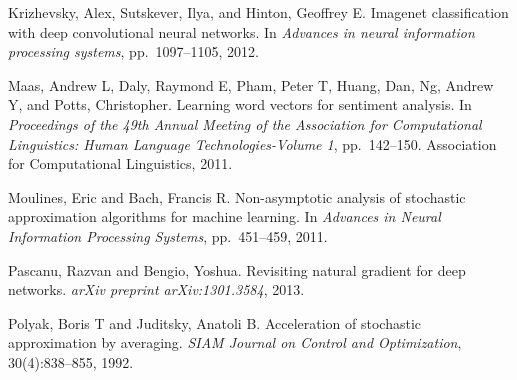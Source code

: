\documentclass[11pt]{article}
\begin{document}
\begin{list}{}{%
  \setlength{\leftmargin}{1.5em}%
  \setlength{\itemindent}{-1.5em}%
  \setlength{\itemsep}{0.5em}%
  \setlength{\parsep}{0pt}%
}
\item Krizhevsky, Alex, Sutskever, Ilya, and Hinton, Geoffrey E.
Imagenet classification with deep convolutional neural networks.
In \emph{Advances in neural information processing systems},
pp.~1097--1105, 2012.

\item Maas, Andrew L, Daly, Raymond E, Pham, Peter T, Huang,
Dan, Ng, Andrew Y, and Potts, Christopher. Learning word vectors
for sentiment analysis. In \emph{Proceedings of the 49th Annual
Meeting of the Association for Computational Linguistics: Human
Language Technologies-Volume 1}, pp.~142--150. Association for
Computational Linguistics, 2011.

\item Moulines, Eric and Bach, Francis R. Non-asymptotic
analysis of stochastic approximation algorithms for machine
learning. In \emph{Advances in Neural Information Processing
Systems}, pp.~451--459, 2011.

\item Pascanu, Razvan and Bengio, Yoshua. Revisiting natural
gradient for deep networks. \emph{arXiv preprint
arXiv:1301.3584}, 2013.

\item Polyak, Boris T and Juditsky, Anatoli B. Acceleration of
stochastic approximation by averaging. \emph{SIAM Journal on
Control and Optimization}, 30(4):838--855, 1992.

\end{list}

\end{document}

